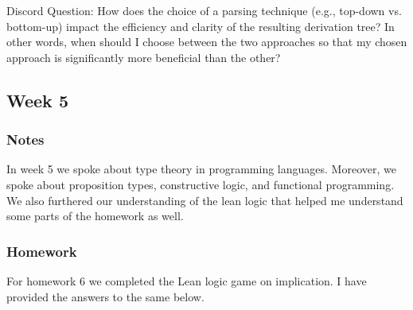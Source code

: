 \documentclass{article}
\theoremstyle{theorem}
\theoremstyle{definition}
\theoremstyle{remark}
\begin{document}
Discord Question: How does the choice of a parsing technique (e.g., top-down vs. bottom-up) impact the efficiency and clarity of the resulting derivation tree? In other words, when should I choose between the two approaches so that my chosen approach is significantly more beneficial than the other?

\subsection{Week 5}
\subsubsection*{Notes}
In week 5 we spoke about type theory in programming languages. Moreover, we spoke about proposition types, constructive logic, and functional programming. We also furthered our understanding of the lean logic that helped me understand some parts of the homework as well.

\subsubsection*{Homework}
For homework 6 we completed the Lean logic game on implication. I have provided the answers to the same below. 
\end{document}
